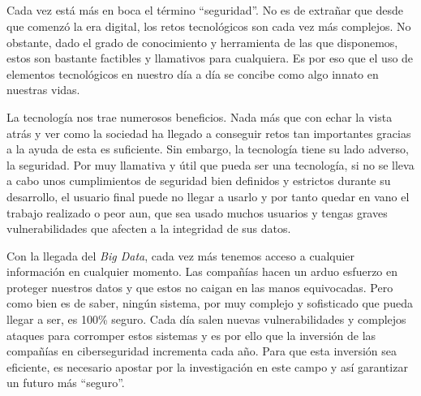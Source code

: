 
\thispagestyle{empty}

\cleardoublepage

\begin{center}
    {\large\bfseries \myTitle}\\
\end{center}

\begin{center}
    \myName\\
\end{center}

\\

\vspace{0.7cm}

\\

Cada vez está más en boca el término ``seguridad''. No es de extrañar que desde que comenzó la era digital, los retos tecnológicos 
son cada vez más complejos. No obstante, dado el grado de conocimiento y herramienta de las que disponemos, estos son bastante 
factibles y llamativos para cualquiera. Es por eso que el uso de elementos tecnológicos en nuestro día a día se
concibe como algo innato en nuestras vidas. 

La tecnología nos trae numerosos beneficios. Nada más que con echar la vista atrás y ver como la sociedad ha llegado a conseguir 
retos tan importantes gracias a la ayuda de esta es suficiente. Sin embargo, la tecnología tiene su lado adverso, la seguridad. 
Por muy llamativa y útil que pueda ser una tecnología, si no se lleva a cabo unos cumplimientos de seguridad bien definidos
y estrictos durante su desarrollo, el usuario final puede no llegar a usarlo y por tanto quedar en vano el trabajo realizado o 
peor aun, que sea usado muchos usuarios y tengas graves vulnerabilidades que afecten a la integridad de sus datos.

Con la llegada del \textit{Big Data}, cada vez más tenemos acceso a cualquier información en cualquier momento. Las compañías 
hacen un arduo esfuerzo en proteger nuestros datos y que estos no caigan en las manos equivocadas. Pero como bien es de saber, 
ningún sistema, por muy complejo y sofisticado que pueda llegar a ser, es 100\% seguro. Cada día salen nuevas vulnerabilidades
y complejos ataques para corromper estos sistemas y es por ello que la inversión de las compañías en ciberseguridad incrementa
cada año. Para que esta inversión sea eficiente, es necesario apostar por la investigación en este campo y así garantizar un 
futuro más ``seguro''.

